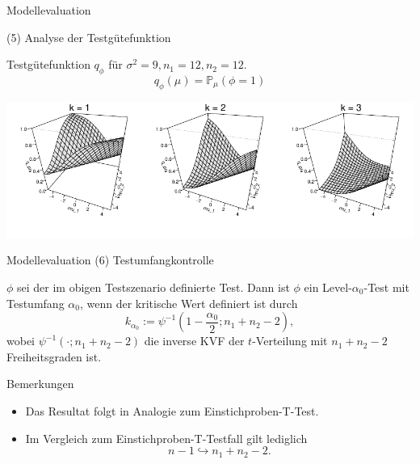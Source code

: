 \documentclass[
  8pt,
  ignorenonframetext,
]{beamer}
\providecommand{\tightlist}{%
  \setlength{\itemsep}{0pt}\setlength{\parskip}{0pt}}
\begin{document}
\begin{frame}{Modellevaluation}
\protect\hypertarget{modellevaluation-30}{}

\noindent (5) Analyse der Testgütefunktion \vfill

\center Testgütefunktion \(q_\phi\) für
\(\sigma^2 = 9, n_1 = 12, n_2 = 12\). \vspace{2mm} \begin{equation*}
q_{\phi}(\mu) = \mathbb{P}_\mu(\phi = 1)
\end{equation*} \vspace{1mm}

\begin{center}\includegraphics[width=1\linewidth]{9_Abbildungen/alm_9_t_test_q_phi_zweistichproben} \end{center}
\vfill
\end{frame}

\begin{frame}{\small Modellevaluation}
\protect\hypertarget{modellevaluation-31}{}
\noindent (6) Testumfangkontrolle \vfill \small

\begin{theorem}[Testumfangkontrolle]
\justifying
\normalfont
$\phi$ sei der im obigen Testszenario definierte Test. Dann ist $\phi$ ein
Level-$\alpha_0$-Test mit Testumfang $\alpha_0$, wenn der kritische Wert
definiert ist durch
\begin{equation}
k_{\alpha_0} := \psi^{-1}\left(1 - \frac{\alpha_0}{2}; n_1 + n_2 - 2 \right),
\end{equation}
wobei $\psi^{-1}(\cdot; n_1+n_2-2)$ die inverse KVF der $t$-Verteilung mit
$n_1+n_2-2$ Freiheitsgraden ist.
\end{theorem}

Bemerkungen

\begin{itemize}
\tightlist
\item
  Das Resultat folgt in Analogie zum Einstichproben-T-Test.
\item
  Im Vergleich zum Einstichproben-T-Testfall gilt lediglich
  \begin{equation}
  n - 1 \hookrightarrow n_1 + n_2 - 2.
  \end{equation} \vfill
\end{itemize}
\end{frame}
\end{document}
